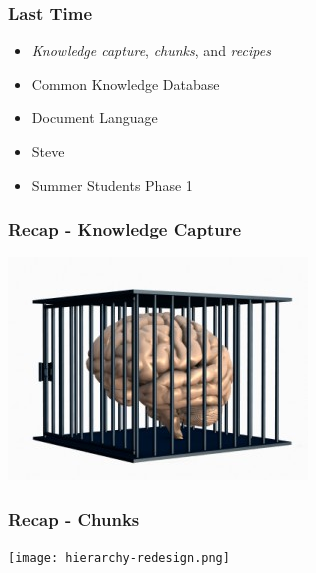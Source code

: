 \documentclass{beamer}
\begin{document}

\begin{frame}

\frametitle{Last Time}
\begin{itemize}
\item \textit{Knowledge capture}, \textit{chunks}, and \textit{recipes}
\item Common Knowledge Database
\item Document Language
\item Steve
\item Summer Students Phase 1
\end{itemize}



\end{frame}


\begin{frame}

\frametitle{Recap - Knowledge Capture}
\begin{center}
\includegraphics[width=.8\textwidth]{KC.jpg}
\end{center}

\end{frame}


\begin{frame}

\frametitle{Recap - Chunks}

\begin{center}
\texttt{[image: hierarchy-redesign.png]}
\end{center}
\end{frame}
\end{document}
